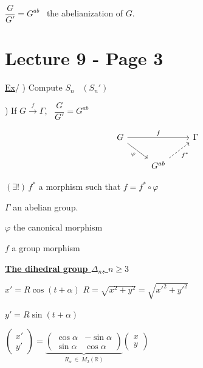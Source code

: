 \bigskip
\noindent $\dfrac{G}{G'} = G^{ab}$ \ the abelianization of $G$.





\section*{Lecture 9 - Page 3}

\noindent\underline{Ex}/ ) Compute $S_n$ \ $(S_n')$

\bigskip
{}) If $G\xrightarrow{f}\Gamma$, \ $\dfrac{G}{G'}=G^{ab}$

\[
\begin{tikzcd}
G \arrow[rr,"f"] \arrow[dr,"\varphi"'] & & \Gamma \\
& G^{ab} \arrow[ur, dashed,"f^*"'] &
\end{tikzcd}
\]

\noindent $(\exists!)\,f^*$ a morphism such that $f=f^*\circ\varphi$

\noindent $\Gamma$ an abelian group.

\bigskip
\noindent $\varphi$ the canonical morphism

\noindent $f$ a group morphism

\bigskip
\bigskip
\noindent\underline{\textbf{The dihedral group $\Delta_n$, $n\geq 3$}}

\bigskip
\noindent $x' = R\cos(t+\alpha)$ \hfill $R = \sqrt{x^2+y^2} = \sqrt{x'^2+y'^2}$

\noindent $y' = R\sin(t+\alpha)$

\begin{center}
\end{center}

\bigskip
\noindent $\begin{pmatrix}x'\\y'\end{pmatrix} = \underbrace{\begin{pmatrix}\cos\alpha & -\sin\alpha\\ \sin\alpha & \cos\alpha\end{pmatrix}}_{R_\alpha\,\in\, M_2(\mathbb{R})}\begin{pmatrix}x\\y\end{pmatrix}$

